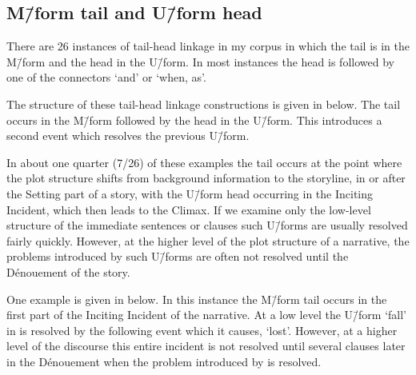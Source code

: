\subsection{M\=/form tail and U\=/form head}\label{sec:MforTaiUforHea}
There are 26 instances of tail-head linkage
in my corpus in which the tail is in the M\=/form and the head in the U\=/form.
In most instances the head is followed by one of the connectors
 `and' or   `when, as'.

The structure of these tail-head linkage constructions
is given in  below.
The tail occurs in the M\=/form followed by the head in the U\=/form.
This introduces a second event which resolves the previous U\=/form.

\begin{exe}
	\label{ex:THL M/U}
\end{exe}

In about one quarter (7/26) of these examples
the tail occurs at the point where the plot structure
shifts from background information to the storyline,
in or after the Setting part of a story,
with the U\=/form head occurring in the Inciting Incident,
which then leads to the Climax.
If we examine only the low-level structure
of the immediate sentences or clauses
such U\=/forms are usually resolved fairly quickly.
However, at the higher level of the plot structure of a narrative,
the problems introduced by such U\=/forms
are often not resolved until the Dénouement of the story.

One example is given in  below.
In this instance the M\=/form tail occurs in the first part
of the Inciting Incident of the narrative.
At a low level the U\=/form  `fall' in 
is resolved by the following event which it causes,  `lost'.
However, at a higher level of the discourse this
entire incident is not resolved until
several clauses later in the Dénouement when the
problem introduced by  is resolved.


